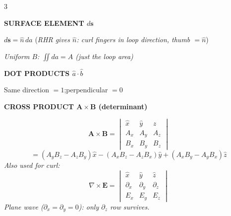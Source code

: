 \documentclass[6pt,letterpaper]{article}
\newcommand{\shead}[3]{%
  \noindent\colorbox{#1}{\parbox{\dimexpr\linewidth-2\fboxsep\relax}%
  {\color{#2}\bfseries\fontsize{6}{7}\selectfont #3}}\vspace{0.5pt}}
\begin{document}
\begin{multicols}{3}
\vspace{2pt}
\shead{purplebg}{purple}{SURFACE ELEMENT $d\mathbf{s}$}
\begin{ebox}
$d\mathbf{s} = \hat{n}\,da$ \quad (\textit{RHR gives $\hat{n}$: curl fingers in loop direction, thumb $= \hat{n}$})\\[2pt]
{\centering{}\par}
\textit{Uniform $B$: $\iint da = A$ (just the loop area)}
\end{ebox}

\vspace{2pt}
\shead{purplebg}{purple}{DOT PRODUCTS $\hat{a}\cdot\hat{b}$}
\begin{ebox}
Same direction $= 1$;\quad perpendicular $= 0$\\[2pt]
{\centering{}\par}
\end{ebox}

\vspace{2pt}
\shead{purplebg}{purple}{CROSS PRODUCT $\mathbf{A}\times\mathbf{B}$ (determinant)}
\begin{ebox}
\[
\mathbf{A}\times\mathbf{B}=
\begin{vmatrix}
\hat{x} & \hat{y} & \hat{z}\\
A_x & A_y & A_z\\
B_x & B_y & B_z
\end{vmatrix}
\]
\[=(A_yB_z-A_zB_y)\hat{x}-(A_xB_z-A_zB_x)\hat{y}+(A_xB_y-A_yB_x)\hat{z}\]
\textit{Also used for curl:}
\[\nabla\times\mathbf{E}=
\begin{vmatrix}
\hat{x} & \hat{y} & \hat{z}\\
\partial_x & \partial_y & \partial_z\\
E_x & E_y & E_z
\end{vmatrix}\]
\textit{Plane wave ($\partial_x=\partial_y=0$): only $\partial_z$ row survives.}
\end{ebox}


\end{multicols}
\end{document}

